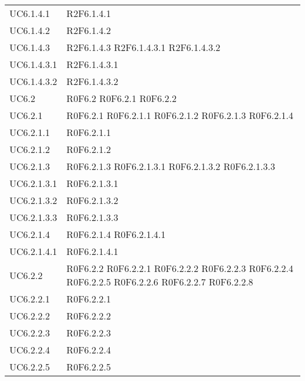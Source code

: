 \begin{longtable}{p{2.5cm}!{\VRule[1pt]}p{5.5cm}}
UC6.1.4.1 & R2F6.1.4.1\\
UC6.1.4.2 & R2F6.1.4.2\\
UC6.1.4.3 & R2F6.1.4.3
	\newline R2F6.1.4.3.1
	\newline R2F6.1.4.3.2\\
UC6.1.4.3.1 & R2F6.1.4.3.1\\
UC6.1.4.3.2 & R2F6.1.4.3.2\\
UC6.2 & R0F6.2
	\newline R0F6.2.1
	\newline R0F6.2.2\\
UC6.2.1 & R0F6.2.1
	\newline R0F6.2.1.1
	\newline R0F6.2.1.2
	\newline R0F6.2.1.3
	\newline R0F6.2.1.4\\
UC6.2.1.1 & R0F6.2.1.1\\
UC6.2.1.2 & R0F6.2.1.2\\
UC6.2.1.3 & R0F6.2.1.3
	\newline R0F6.2.1.3.1
	\newline R0F6.2.1.3.2
	\newline R0F6.2.1.3.3\\
UC6.2.1.3.1 & R0F6.2.1.3.1\\
UC6.2.1.3.2 & R0F6.2.1.3.2\\
UC6.2.1.3.3 & R0F6.2.1.3.3\\
UC6.2.1.4 & R0F6.2.1.4
	\newline R0F6.2.1.4.1\\
UC6.2.1.4.1 & R0F6.2.1.4.1\\
UC6.2.2 & R0F6.2.2
	\newline R0F6.2.2.1
	\newline R0F6.2.2.2
	\newline R0F6.2.2.3
	\newline R0F6.2.2.4
	\newline R0F6.2.2.5
	\newline R0F6.2.2.6
	\newline R0F6.2.2.7
	\newline R0F6.2.2.8\\
UC6.2.2.1 & R0F6.2.2.1\\
UC6.2.2.2 & R0F6.2.2.2\\
UC6.2.2.3 & R0F6.2.2.3\\
UC6.2.2.4 & R0F6.2.2.4\\
UC6.2.2.5 & R0F6.2.2.5\\

\end{longtable}
